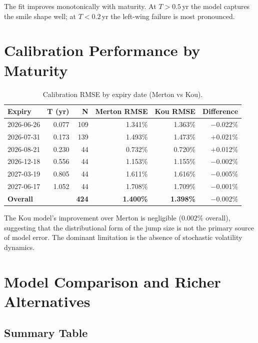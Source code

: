 \documentclass[12pt, a4paper]{article}
\begin{document}
The fit improves monotonically with maturity. At $T > 0.5$\,yr the model
captures the smile shape well; at $T < 0.2$\,yr the left-wing failure is most
pronounced.

\section{Calibration Performance by Maturity}

\begin{table}[H]
\centering
\caption{Calibration RMSE by expiry date (Merton vs Kou).}
\begin{tabular}{lrrrrr}
\toprule
\textbf{Expiry} & \textbf{T (yr)} & \textbf{N} &
\textbf{Merton RMSE} & \textbf{Kou RMSE} & \textbf{Difference} \\
\midrule
2026-06-26 & 0.077 & 109 & 1.341\% & 1.363\% & $-$0.022\% \\
2026-07-31 & 0.173 & 139 & 1.493\% & 1.473\% & $+$0.021\% \\
2026-08-21 & 0.230 &  44 & 0.732\% & 0.720\% & $+$0.012\% \\
2026-12-18 & 0.556 &  44 & 1.153\% & 1.155\% & $-$0.002\% \\
2027-03-19 & 0.805 &  44 & 1.611\% & 1.616\% & $-$0.005\% \\
2027-06-17 & 1.052 &  44 & 1.708\% & 1.709\% & $-$0.001\% \\
\midrule
\textbf{Overall} & & \textbf{424} & \textbf{1.400\%} & \textbf{1.398\%} & $-$0.002\% \\
\bottomrule
\end{tabular}
\label{tab:rmse}
\end{table}

The Kou model's improvement over Merton is negligible ($0.002\%$ overall),
suggesting that the distributional form of the jump size is not the primary
source of model error. The dominant limitation is the absence of stochastic
volatility dynamics.

\section{Model Comparison and Richer Alternatives}

\subsection{Summary Table}
\end{document}
